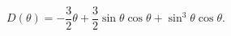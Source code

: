 \begin{equation}
D\left( \theta \right) =-\frac{3}{2}\theta +\frac{3}{2}\sin \theta \cos
\theta +\sin ^{3}\theta \cos \theta .  \label{solufive}
\end{equation}

